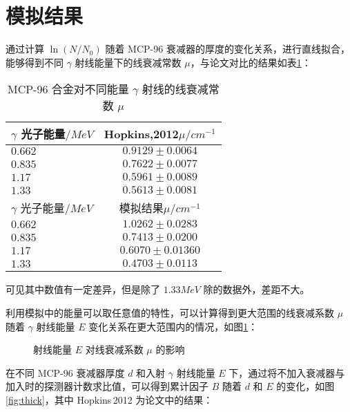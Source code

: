 \section{模拟结果}

通过计算 $\ln(N/N_0)$ 随着 MCP-96 衰减器的厚度的变化关系，进行直线拟合，能够得到不同 $\gamma$ 射线能量下的线衰减常数 $\mu$，与论文\cite{hopkins_linear_2012}对比的结果如表\ref{tab:atten}：

\begin{table}[H]
    \centering
    \caption{MCP-96 合金对不同能量 $\gamma$ 射线的线衰减常数 $\mu$}
    \label{tab:atten}
    \begin{tabular}{l|c}
    \toprule
    $\gamma$ 光子能量$/\si{MeV}$ & Hopkins,2012$\mu/\si{cm^{-1}}$ \\ 
    \hline
    $0.662$ & $0.9129\pm0.0064$ \\
    \hline
    $0.835$ & $0.7622\pm0.0077$ \\
    \hline
    $1.17$ & $0.5961\pm0.0089$ \\
    \hline
    $1.33$ & $0.5613\pm0.0081$ \\
    \bottomrule
    \toprule
    $\gamma$ 光子能量$/\si{MeV}$ & 模拟结果$\mu/\si{cm^{-1}}$ \\ 
    \hline
    $0.662$ & $1.0262\pm0.0283$ \\
    \hline
    $0.835$ & $0.7413\pm0.0200$ \\
    \hline
    $1.17$ & $0.6070\pm0.01360$ \\
    \hline
    $1.33$ & $0.4703\pm0.0113$ \\
    \bottomrule
    \end{tabular}
\end{table}

可见其中数值有一定差异，但是除了 $1.33\si{MeV}$ 除的数据外，差距不大。

利用模拟中的能量可以取任意值的特性，可以计算得到更大范围的线衰减系数 $\mu$ 随着 $\gamma$ 射线能量 $E$ 变化关系在更大范围内的情况，如图\ref{fig:atten}：

\begin{figure}[!htb]
  \centering
  \resizebox{\linewidth}{!}{}
  \caption{\label{fig:atten}射线能量 $E$ 对线衰减系数 $\mu$ 的影响}
\end{figure}

在不同 MCP-96 衰减器厚度 $d$ 和入射 $\gamma$ 射线能量 $E$ 下，通过将不加入衰减器与加入时的探测器计数求比值，可以得到累计因子 $B$ 随着 $d$ 和 $E$ 的变化，如图\ref{fig:thick}，其中 Hopkins\,2012 为论文\cite{hopkins_linear_2012}中的结果：

